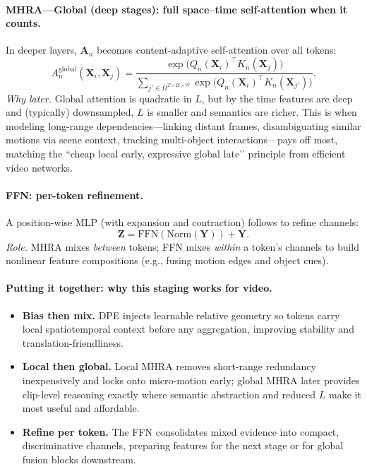 \begin{enrichment}
\begin{enrichment}
        \paragraph{MHRA—Global (deep stages): full space–time self-attention when it counts.}
        In deeper layers, \(\bm{A}_n\) becomes content-adaptive self-attention over all tokens:
        \begin{equation}
            A_{n}^{\mathrm{global}}(\bm{X}_i,\bm{X}_j)=
            \frac{\exp\big(Q_n(\bm{X}_i)^\top K_n(\bm{X}_j)\big)}
            {\sum_{j'\in\Omega^{T\times H\times W}}\exp\big(Q_n(\bm{X}_i)^\top K_n(\bm{X}_{j'})\big)}.
            \label{eq:uni_global}
        \end{equation}
        \emph{Why later.} Global attention is quadratic in \(L\), but by the time features are deep and (typically) downsampled, \(L\) is smaller and semantics are richer. This is when modeling long-range dependencies—linking distant frames, disambiguating similar motions via scene context, tracking multi-object interactions—pays off most, matching the ``cheap local early, expressive global late’’ principle from efficient video networks.
        
        \paragraph{FFN: per-token refinement.}
        A position-wise MLP (with expansion and contraction) follows to refine channels:
        \begin{equation}
            \bm{Z}=\mathrm{FFN}(\mathrm{Norm}(\bm{Y})) + \bm{Y}.
            \label{eq:uni_ffn}
        \end{equation}
        \emph{Role.} MHRA mixes \emph{between} tokens; FFN mixes \emph{within} a token’s channels to build nonlinear feature compositions (e.g., fusing motion edges and object cues).
        
        \paragraph{Putting it together: why this staging works for video.}
        \begin{itemize}
            \item \textbf{Bias then mix.} DPE injects learnable relative geometry so tokens carry local spatiotemporal context before any aggregation, improving stability and translation-friendliness. 
            \item \textbf{Local then global.} Local MHRA removes short-range redundancy inexpensively and locks onto micro-motion early; global MHRA later provides clip-level reasoning exactly where semantic abstraction and reduced \(L\) make it most useful and affordable. 
            \item \textbf{Refine per token.} The FFN consolidates mixed evidence into compact, discriminative channels, preparing features for the next stage or for global fusion blocks downstream. 
        \end{itemize}


\end{enrichment}
\end{enrichment}
